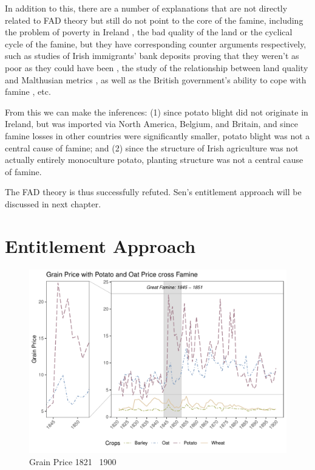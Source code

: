In addition to this, there are a number of explanations that are not directly related to FAD theory but still do not point to the core of the famine, including the problem of poverty in Ireland \citep{gilleard2016other, gray2010irish}, the bad quality of the land \citep{whelan2012clachans} or the cyclical cycle of the famine, but they have corresponding counter arguments respectively, such as studies of Irish immigrants' bank deposits proving that they weren't as poor as they could have been \citep{wegge2017immigrants}, the study of the relationship between land quality and Malthusian metrics \citep{donnelly2002great}, as well as the British government's ability to cope with famine \citep{kelly2015ireland}, etc.

From this we can make the inferences: (1) since potato blight did not originate in Ireland, but was imported via North America, Belgium, and Britain, and since famine losses in other countries were significantly smaller, potato blight was not a central cause of famine; and (2) since the structure of Irish agriculture was not actually entirely monoculture potato, planting structure was not a central cause of famine.

The FAD theory is thus successfully refuted. Sen's entitlement approach will be discussed in next chapter.

\section{Entitlement Approach}

\begin{figure}[htbp]
    \centering
    \caption{Grain Price 1821 \textendash\ 1900}
    \includegraphics[width=.95\textwidth]{../03_outputs/grain_price.pdf}
\end{figure}



